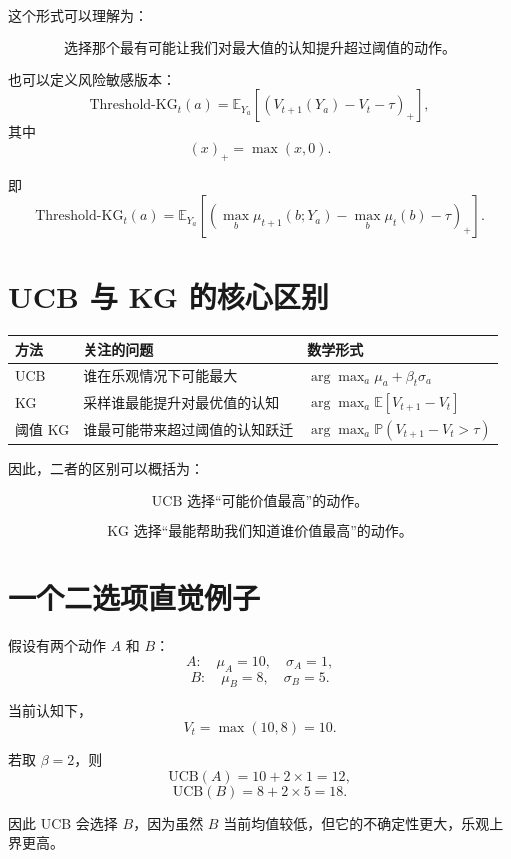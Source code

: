\documentclass[UTF8,12pt]{ctexart}
\begin{document}
这个形式可以理解为：

\[
\boxed{
\text{选择那个最有可能让我们对最大值的认知提升超过阈值的动作。}
}
\]

也可以定义风险敏感版本：
\[
\mathrm{Threshold\text{-}KG}_t(a)
=
\mathbb E_{Y_a}
\left[
\left(
V_{t+1}(Y_a)-V_t-\tau
\right)_+
\right],
\]
其中
\[
(x)_+ = \max(x,0).
\]

即
\[
\mathrm{Threshold\text{-}KG}_t(a)
=
\mathbb E_{Y_a}
\left[
\left(
\max_b \mu_{t+1}(b;Y_a)
-
\max_b \mu_t(b)
-\tau
\right)_+
\right].
\]

\section{UCB 与 KG 的核心区别}

\begin{table}[h]
\centering
\begin{tabular}{lll}
\toprule
方法 & 关注的问题 & 数学形式 \\
\midrule
UCB 
& 谁在乐观情况下可能最大 
& $\arg\max_a \mu_a+\beta_t\sigma_a$ \\

KG 
& 采样谁最能提升对最优值的认知 
& $\arg\max_a \mathbb E[V_{t+1}-V_t]$ \\

阈值 KG 
& 谁最可能带来超过阈值的认知跃迁 
& $\arg\max_a \mathbb P(V_{t+1}-V_t>\tau)$ \\
\bottomrule
\end{tabular}
\end{table}

因此，二者的区别可以概括为：

\[
\boxed{
\text{UCB 选择“可能价值最高”的动作。}
}
\]

\[
\boxed{
\text{KG 选择“最能帮助我们知道谁价值最高”的动作。}
}
\]

\section{一个二选项直觉例子}

假设有两个动作 $A$ 和 $B$：
\[
A:\quad \mu_A=10,\quad \sigma_A=1,
\]
\[
B:\quad \mu_B=8,\quad \sigma_B=5.
\]

当前认知下，
\[
V_t=\max(10,8)=10.
\]

若取 $\beta=2$，则
\[
\mathrm{UCB}(A)=10+2\times 1=12,
\]
\[
\mathrm{UCB}(B)=8+2\times 5=18.
\]

因此 UCB 会选择 $B$，因为虽然 $B$ 当前均值较低，但它的不确定性更大，乐观上界更高。
\end{document}
